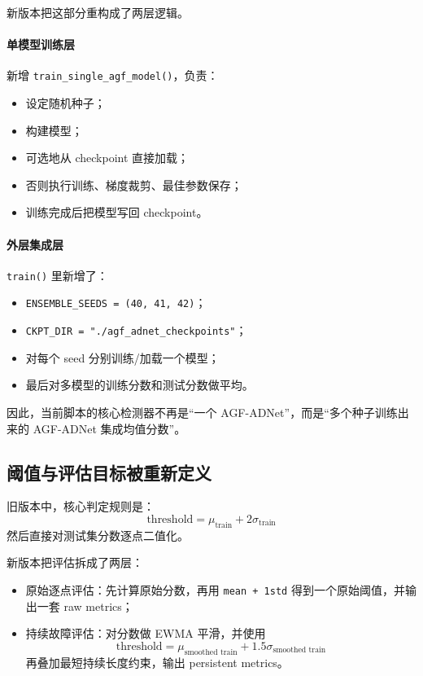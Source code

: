 \documentclass[UTF8]{ctexart}
\begin{document}
新版本把这部分重构成了两层逻辑。

\paragraph{单模型训练层}
新增 \texttt{train\_single\_agf\_model()}，负责：
\begin{itemize}
    \item 设定随机种子；
    \item 构建模型；
    \item 可选地从 checkpoint 直接加载；
    \item 否则执行训练、梯度裁剪、最佳参数保存；
    \item 训练完成后把模型写回 checkpoint。
\end{itemize}

\paragraph{外层集成层}
\texttt{train()} 里新增了：
\begin{itemize}
    \item \texttt{ENSEMBLE\_SEEDS = (40, 41, 42)}；
    \item \texttt{CKPT\_DIR = "./agf\_adnet\_checkpoints"}；
    \item 对每个 seed 分别训练/加载一个模型；
    \item 最后对多模型的训练分数和测试分数做平均。
\end{itemize}

因此，当前脚本的核心检测器不再是“一个 AGF-ADNet”，而是“多个种子训练出来的 AGF-ADNet 集成均值分数”。

\subsection{阈值与评估目标被重新定义}

旧版本中，核心判定规则是：
\begin{equation}
\text{threshold} = \mu_{\text{train}} + 2 \sigma_{\text{train}}
\end{equation}
然后直接对测试集分数逐点二值化。

新版本把评估拆成了两层：
\begin{itemize}
    \item 原始逐点评估：先计算原始分数，再用 \texttt{mean + 1std} 得到一个原始阈值，并输出一套 raw metrics；
    \item 持续故障评估：对分数做 EWMA 平滑，并使用
    \begin{equation}
    \text{threshold} = \mu_{\text{smoothed train}} + 1.5 \sigma_{\text{smoothed train}}
    \end{equation}
    再叠加最短持续长度约束，输出 persistent metrics。
\end{itemize}
\end{document}
